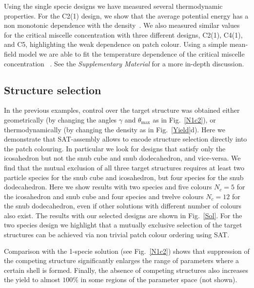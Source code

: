 \documentclass[a4paper, amsfonts, amssymb, amsmath, reprint, showkeys, nofootinbib, oneside]{revtex4-1}
\begin{document}
Using the single specie designs we have measured several thermodynamic properties. For the C2(1) design, we show that the average potential energy has a non monotonic dependence with the density~\cite{Sciortino2009}. We also measured similar values for the critical miscelle concentration with three different designs, C2(1), C4(1), and C5, highlighting the weak dependence on patch colour. Using a simple mean-field model we are able to fit the temperature dependence of the critical miscelle concentration ~\cite{Kraft2012, Hatch2016}. See the \textit{Supplementary Material} for a more in-depth discussion.

\subsection{Structure selection}

In the previous examples, control over the target structure was obtained either geometrically (by changing the angles $\gamma$ and $\theta_\text{max}$ as in Fig.~\ref{N1c2}), or thermodynamically (by changing the density as in Fig.~\ref{Yield}d). Here we demonstrate that SAT-assembly allows to encode structure selection directly into the patch colouring. In particular we look for designs that satisfy only the icosahedron but not the snub cube and snub dodecahedron, and vice-versa. We find that the mutual exclusion of all three target structures requires at least two particle species for the snub cube and icosahedron, but four species for the snub dodecahedron. Here we show results with two species and five colours $N_c=5$ for the icosahedron and snub cube and four species and twelve colours $N_c=12$ for the snub dodecahedron, even if other solutions with different number of colours also exist. The results with our selected designs are shown in Fig.~\ref{Sol}. For the two species design we highlight that a mutually exclusive selection of the target structures can be achieved via non trivial patch colour ordering using SAT.



Comparison with the 1-specie solution (see Fig.~\ref{N1c2}) shows that suppression of the competing structure significantly enlarges the range of parameters where a certain shell is formed. Finally, the absence of competing structures also increases the yield to almost $100\%$ in some regions of the parameter space (not shown).
\end{document}
